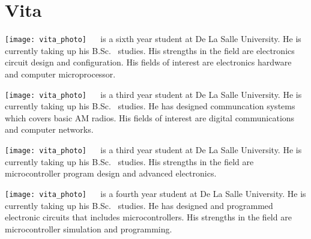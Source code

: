 \chapter{Vita}


\texttt{[image: vita\_photo]}
 \  \ is a sixth year student at De La Salle University. He is currently taking up his B.Sc. \degree \ studies. His strengths in the field are electronics circuit design and configuration. His fields of interest are electronics hardware and computer microprocessor.

\texttt{[image: vita\_photo]}
 \  \ is a third year student at De La Salle University. He is currently taking up his B.Sc. \degree \ studies. He has designed communcation systems which covers basic AM radios. His fields of interest are digital communications and computer networks.

\texttt{[image: vita\_photo]}
 \  \ is a third year student at De La Salle University. He is currently taking up his B.Sc. \degree \ studies.  His strengths in the field are microcontroller program design and advanced electronics.

\texttt{[image: vita\_photo]}
 \  \ is a fourth year student at De La Salle University. He is currently taking up his B.Sc. \degree \ studies.  He has designed and programmed electronic circuits that includes microcontrollers. His strengths in the field are microcontroller simulation and programming.

